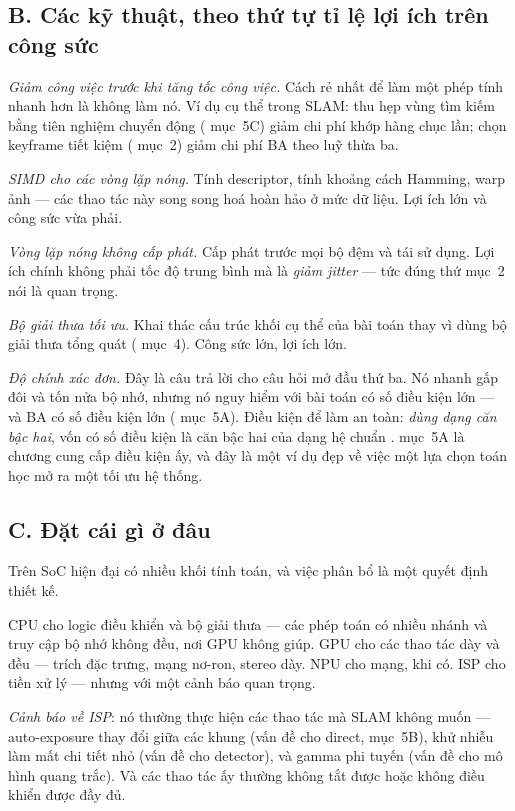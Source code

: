 \documentclass[../../vslam.tex]{subfiles}
\begin{document}
\subsection{B. Các kỹ thuật, theo thứ tự tỉ lệ lợi ích trên công sức}

\emph{Giảm công việc trước khi tăng tốc công việc.} Cách rẻ nhất để làm một phép tính nhanh hơn là không làm nó. Ví dụ cụ thể trong SLAM: thu hẹp vùng tìm kiếm bằng tiên nghiệm chuyển động ( mục~5C) giảm chi phí khớp hàng chục lần; chọn keyframe tiết kiệm ( mục~2) giảm chi phí BA theo luỹ thừa ba.

\emph{SIMD cho các vòng lặp nóng.} Tính descriptor, tính khoảng cách Hamming, warp ảnh --- các thao tác này song song hoá hoàn hảo ở mức dữ liệu. Lợi ích lớn và công sức vừa phải.

\emph{Vòng lặp nóng không cấp phát.} Cấp phát trước mọi bộ đệm và tái sử dụng. Lợi ích chính không phải tốc độ trung bình mà là \emph{giảm jitter} --- tức đúng thứ mục~2 nói là quan trọng.

\emph{Bộ giải thưa tối ưu.} Khai thác cấu trúc khối cụ thể của bài toán thay vì dùng bộ giải thưa tổng quát ( mục~4). Công sức lớn, lợi ích lớn.

\emph{Độ chính xác đơn.} Đây là câu trả lời cho câu hỏi mở đầu thứ ba. Nó nhanh gấp đôi và tốn nửa bộ nhớ, nhưng nó nguy hiểm với bài toán có số điều kiện lớn --- và BA có số điều kiện lớn ( mục~5A). Điều kiện để làm an toàn: \emph{dùng dạng căn bậc hai}, vốn có số điều kiện là căn bậc hai của dạng hệ chuẩn \cite{demmel2021rootba}.  mục~5A là chương cung cấp điều kiện ấy, và đây là một ví dụ đẹp về việc một lựa chọn toán học mở ra một tối ưu hệ thống.

\subsection{C. Đặt cái gì ở đâu}

Trên SoC hiện đại có nhiều khối tính toán, và việc phân bổ là một quyết định thiết kế.

CPU cho logic điều khiển và bộ giải thưa --- các phép toán có nhiều nhánh và truy cập bộ nhớ không đều, nơi GPU không giúp. GPU cho các thao tác dày và đều --- trích đặc trưng, mạng nơ-ron, stereo dày. NPU cho mạng, khi có. ISP cho tiền xử lý --- nhưng với một cảnh báo quan trọng.

\emph{Cảnh báo về ISP}: nó thường thực hiện các thao tác mà SLAM không muốn --- auto-exposure thay đổi giữa các khung (vấn đề cho direct,  mục~5B), khử nhiễu làm mất chi tiết nhỏ (vấn đề cho detector), và gamma phi tuyến (vấn đề cho mô hình quang trắc). Và các thao tác ấy thường không tắt được hoặc không điều khiển được đầy đủ.
\end{document}
